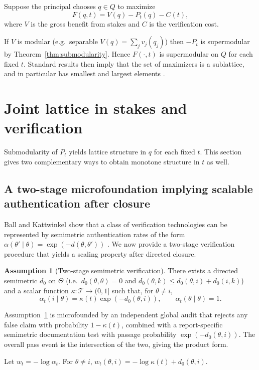 \documentclass[final,3p,times]{elsarticle}
\theoremstyle{plain}
\theoremstyle{definition}
\newtheorem{assumption}{Assumption}
\newcommand{\1}{\mathbbm{1}}
\newcommand{\ThetaSet}{\Theta}
\newcommand{\cT}{\mathcal{T}}
\begin{document}
Suppose the principal chooses $q\in Q$ to maximize
\[
F(q,t)=V(q)-P_t(q)-C(t),
\]
where $V$ is the gross benefit from stakes and $C$ is the verification cost.

If $V$ is modular (e.g.\ separable $V(q)=\sum_j v_j(q_j)$) then $-P_t$ is supermodular by Theorem~\ref{thm:submodularity}. Hence $F(\cdot,t)$ is supermodular on $Q$ for each fixed $t$. Standard results then imply that the set of maximizers is a sublattice, and in particular has smallest and largest elements \citep{Topkis1998}. 

\section{Joint lattice in stakes and verification}\label{sec:jointlattice}

Submodularity of $P_t$ yields lattice structure in $q$ for each fixed $t$. This section gives two complementary ways to obtain monotone structure in $t$ as well.

\subsection{A two-stage microfoundation implying scalable authentication after closure}

Ball and Kattwinkel show that a class of verification technologies can be represented by semimetric authentication rates of the form $\alpha(\theta'\mid\theta)=\exp(-d(\theta,\theta'))$ \citep{BallKattwinkel2025}. We now provide a two-stage verification procedure that yields a scaling property after directed closure.

\begin{assumption}[Two-stage semimetric verification]\label{ass:twostage}
There exists a directed semimetric $d_0$ on $\ThetaSet$ (i.e.\ $d_0(\theta,\theta)=0$ and $d_0(\theta,k)\le d_0(\theta,i)+d_0(i,k)$) and a scalar function $\kappa:\cT\to(0,1]$ such that, for $\theta\neq i$,
\[
\alpha_t(i\mid\theta)=\kappa(t)\exp(-d_0(\theta,i)),\qquad \alpha_t(\theta\mid\theta)=1.
\]
\end{assumption}

Assumption~\ref{ass:twostage} is microfounded by an independent global audit that rejects any false claim with probability $1-\kappa(t)$, combined with a report-specific semimetric documentation test with passage probability $\exp(-d_0(\theta,i))$. The overall pass event is the intersection of the two, giving the product form.

Let $w_t=-\log\alpha_t$. For $\theta\neq i$, $w_t(\theta,i)=-\log\kappa(t)+d_0(\theta,i)$.
\end{document}
